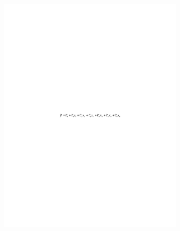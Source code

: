 \begin{figure}[H]
	\centering
	\includegraphics[width=0.8\textwidth]{media/ict/image93}
	\caption*{}
\end{figure}


